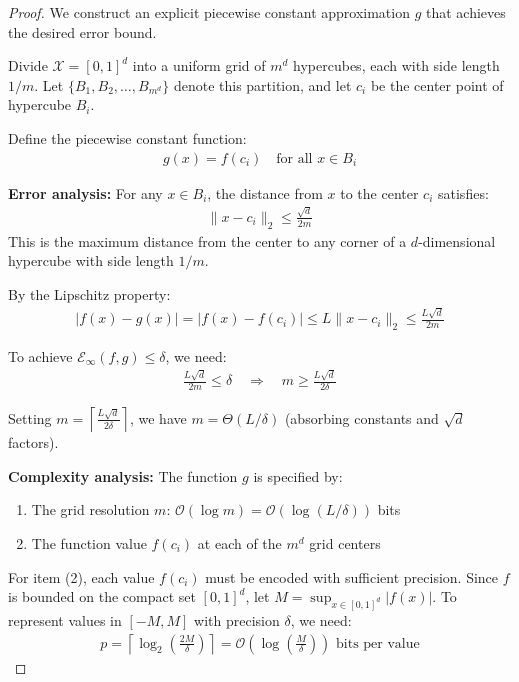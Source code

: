 \documentclass[11pt,letter,leqno]{article}
\begin{document}
\begin{proof}
We construct an explicit piecewise constant approximation $g$ that achieves the desired error bound.

Divide $\mathcal{X} = [0, 1]^d$ into a uniform grid of $m^d$ hypercubes, each with side length $1/m$. Let $\{B_1, B_2, \ldots, B_{m^d}\}$ denote this partition, and let $c_i$ be the center point of hypercube $B_i$.

Define the piecewise constant function:
\begin{align}
g(x) = f(c_i) \quad \text{for all } x \in B_i
\end{align}

\textbf{Error analysis:} For any $x \in B_i$, the distance from $x$ to the center $c_i$ satisfies:
\begin{align}
\|x - c_i\|_2 \leq \frac{\sqrt{d}}{2m}
\end{align}
This is the maximum distance from the center to any corner of a $d$-dimensional hypercube with side length $1/m$.

By the Lipschitz property:
\begin{align}
|f(x) - g(x)| = |f(x) - f(c_i)| \leq L \|x - c_i\|_2 \leq \frac{L\sqrt{d}}{2m}
\end{align}

To achieve $\mathcal{E}_{\infty}(f, g) \leq \delta$, we need:
\begin{align}
\frac{L\sqrt{d}}{2m} \leq \delta \quad \Rightarrow \quad m \geq \frac{L\sqrt{d}}{2\delta}
\end{align}

Setting $m = \left\lceil\frac{L\sqrt{d}}{2\delta}\right\rceil$, we have $m = \Theta(L/\delta)$ (absorbing constants and $\sqrt{d}$ factors).

\textbf{Complexity analysis:} The function $g$ is specified by:
\begin{enumerate}
\item The grid resolution $m$: $\mathcal{O}(\log m) = \mathcal{O}(\log(L/\delta))$ bits
\item The function value $f(c_i)$ at each of the $m^d$ grid centers
\end{enumerate}

For item (2), each value $f(c_i)$ must be encoded with sufficient precision. Since $f$ is bounded on the compact set $[0,1]^d$, let $M = \sup_{x \in [0,1]^d} |f(x)|$. To represent values in $[-M, M]$ with precision $\delta$, we need:
\begin{align}
p = \left\lceil\log_2\left(\frac{2M}{\delta}\right)\right\rceil = \mathcal{O}\left(\log\left(\frac{M}{\delta}\right)\right) \text{ bits per value}
\end{align}


\end{proof}
\end{document}
